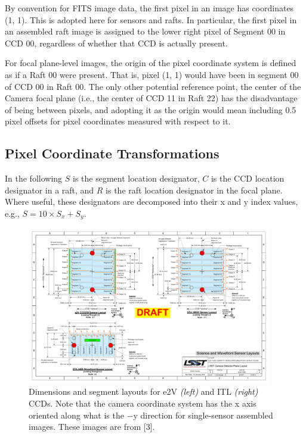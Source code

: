 \documentclass{article}[12pt]
\begin{document}
By convention for FITS image data, the first pixel in an image has coordinates (1, 1).  This is adopted here for sensors and rafts.  In particular, the first pixel in an assembled raft image is assigned to the lower right pixel of Segment 00 in CCD 00, regardless of whether that CCD is actually present.  

For focal plane-level images, the origin of the pixel coordinate system is defined as if a Raft 00 were present.  That is, pixel (1, 1) would have been in segment 00 of CCD 00 in Raft 00.  The only other potential reference point, the center of the Camera focal plane (i.e., the center of CCD 11 in Raft 22) has the disadvantage of being between pixels, and adopting it as the origin would mean including 0.5 pixel offsets for pixel coordinates measured with respect to it.

\subsection{Pixel Coordinate Transformations}
In the following $S$ is the segment location designator, $C$ is the CCD location designator in a raft, and $R$ is the raft location designator in the focal plane.  Where useful, these designators are decomposed into their x and y index values, e.g., $S = 10 \times S_x + S_y$.

\begin{figure}
\centering
    \includegraphics[width=0.95\textwidth]{sensor_layout.pdf}
    \caption{Dimensions and segment layouts for e2V {\it (left)} and ITL {\it (right)} CCDs.  Note that the camera coordinate system has the x axis oriented along what is the $-$y direction for single-sensor assembled images.  These images are from [3].}
    \label{fig:sensor}
\end{figure}
\end{document}
